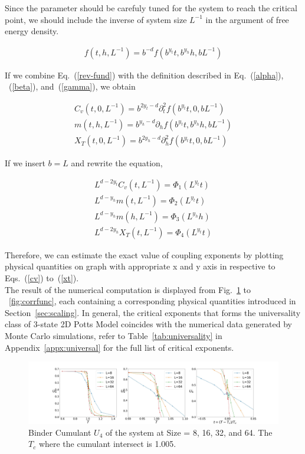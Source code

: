 \documentclass[%
 reprint,
 amsmath,amssymb,
 aps,
]{revtex4-2}
\begin{document}
Since the parameter should be carefuly tuned for the system to reach the critical point, 
we should include the inverse of system size $L^{-1}$ in the argument of free energy 
density. 

\begin{eqnarray}
f(t,h,L^{-1}) = b^{-d}f(b^{y_{t}}t, b^{y_{h}}h, bL^{-1}) \label{rev-fund}
\end{eqnarray}

If we combine Eq.~(\ref{rev-fund}) with the definition described in Eq.~(\ref{alpha}),
~(\ref{beta}), and~(\ref{gamma}), we obtain

\begin{gather}
C_{v}(t,0,L^{-1}) = b^{2y_{t}-d}\partial_{t}^{2}f(b^{y_{t}}t,0,bL^{-1}) \\
m(t,h,L^{-1}) = b^{y_{h}-d}\partial_{h}f(b^{y_{t}}t,b^{y_{h}}h,bL^{-1}) \\
X_{T}(t,0,L^{-1}) = b^{2y_{h}-d}\partial_{h}^{2}f(b^{y_{t}}t,0,bL^{-1})
\end{gather}

If we insert $b=L$ and rewrite the equation,

\begin{gather}
L^{d-2y_{t}}C_{v}(t,L^{-1}) = \Phi_{1}(L^{y_{t}}t) \label{cv} \\
L^{d-y_{h}}m(t,L^{-1}) = \Phi_{2}(L^{y_{t}}t) \label{m1} \\
L^{d-y_{h}}m(h,L^{-1}) = \Phi_{3}(L^{y_{h}}h) \label{m2} \\
L^{d-2y_{h}}X_{T}(t,L^{-1}) = \Phi_{4}(L^{y_{t}}t) \label{xt}
\end{gather}

Therefore, we can estimate the exact value of coupling exponents by plotting physical 
quantities on graph with appropriate x and y axis in respective to Eqs.~(\ref{cv}) 
to~(\ref{xt}). \\

The result of the numerical computation is displayed from Fig.~\ref{fig:binder} to
~\ref{fig:corrfunc}, each containing a corresponding physical quantities introduced 
in Section~\ref{sec:scaling}. In general, the critical exponents that forms the 
universality class of 3-state 2D Potts Model coincides with the numerical data generated 
by Monte Carlo simulations, refer to Table~\ref{tab:universality} in 
Appendix~\ref{appx:universal} for the full list of critical exponents.

\begin{figure}[b]
\includegraphics[width=1\textwidth]{../fig/Binder Cumulant (3-state 2D Potts).jpg}
\caption{\label{fig:binder} Binder Cumulant $U_{4}$ of the system at Size = 8, 16, 32, 
and 64. The $T_{c}$ where the cumulant intersect is 1.005.}
\end{figure}
\end{document}
